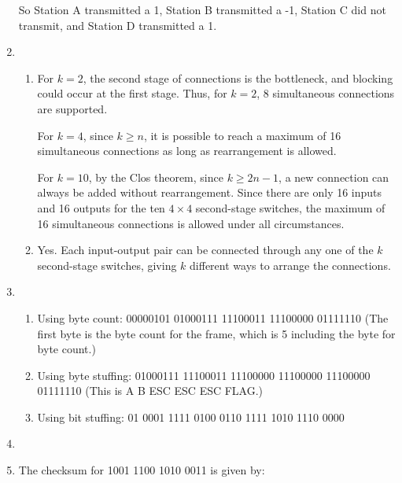 \documentclass{article}
\begin{document}
\begin{enumerate}
So Station A transmitted a 1, Station B transmitted a -1, Station C did not transmit, and Station D transmitted a 1.

\item
\begin{enumerate}

\item For $k=2$, the second stage of connections is the bottleneck, and blocking could occur at the first stage. Thus, for $k=2$, 8 simultaneous connections are supported.

For $k=4$, since $k \geq n$, it is possible to reach a maximum of 16 simultaneous connections as long as rearrangement is allowed.

For $k=10$, by the Clos theorem, since $k \geq 2n-1$, a new connection can always be added without rearrangement. Since there are only 16 inputs and 16 outputs for the ten $4 \times 4$ second-stage switches, the maximum of 16 simultaneous connections is allowed under all circumstances.

\item Yes. Each input-output pair can be connected through any one of the $k$ second-stage switches, giving $k$ different ways to arrange the connections.

\end{enumerate}

\item
\begin{enumerate}

\item Using byte count:  00000101 01000111 11100011 11100000 01111110 (The first byte is the byte count for the frame, which is 5 including the byte for byte count.)

\item Using byte stuffing: 01000111 11100011 11100000 11100000 11100000 01111110
(This is A B ESC ESC ESC FLAG.) 

\item Using bit stuffing: 01 0001 1111 0100 0110 1111 1010 1110 0000

\end{enumerate}

\item 

\item The checksum for 1001 1100 1010 0011 is given by:


\end{enumerate}
\end{document}
